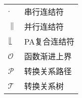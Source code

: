 \begin{tabular}{ll}
 \hspace{2em}$.$ &\hspace{5em}串行连结符\\
 \hspace{2em}$\parallel$ &\hspace{5em}并行连结符\\
 \hspace{2em}$\llfloor$ &\hspace{5em}PA复合连结符\\
 \hspace{2em}$\mathscr{O}$ &\hspace{5em}函数渐进上界\\
 \hspace{2em}$\mathcal{P}$ &\hspace{5em}转换关系路径\\
 \hspace{2em}$\mathcal{T}$ &\hspace{5em}转换关系树\\ 
\end{tabular}
